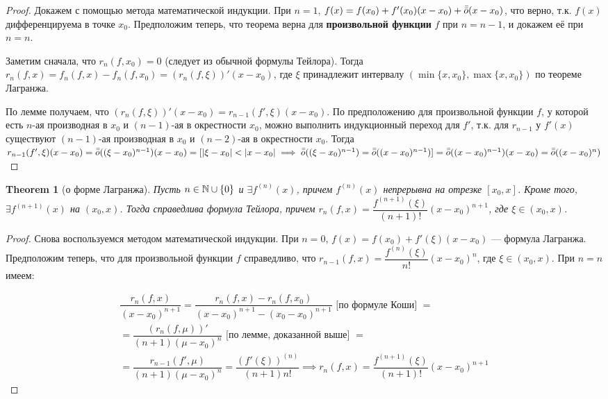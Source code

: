 \documentclass[a4paper]{article}
\theoremstyle{named}
\newtheorem*{namedtheorem}{Theorem}
\begin{document}
\begin{colloq}
		\begin{proof}
			Докажем с помощью метода математической индукции. При $n = 1$, $f(x) = f(x_0) + f'(x_0)(x - x_0) + \bar{\bar{o}}(x - x_0)$, что верно, т.к. $f(x)$ дифференцируема в точке $x_0$. Предположим теперь, что теорема верна для \textbf{произвольной функции} $f$ при $n = n - 1$, и докажем её при $n = n$.

			Заметим сначала, что $r_n(f, x_0) = 0$ (следует из обычной формулы Тейлора). Тогда $r_n(f, x) = f_n(f, x) - f_n(f, x_0) = (r_n(f, \xi))'(x - x_0)$, где $\xi$ принадлежит интервалу $(\min\{x, x_0\}, \max\{x, x_0\})$ по теореме Лагранжа.

			По лемме получаем, что $(r_n(f, \xi))'(x - x_0) = r_{n - 1}(f', \xi)(x - x_0)$. По предположению для произвольной функции $f$, у которой есть $n$-ая производная в $x_0$ и $(n - 1)$-ая в окрестности $x_0$, можно выполнить индукционный переход для $f'$, т.к. для $r_{n - 1}$ у $f'(x)$ существуют $(n - 1)$-ая производная в $x_0$ и $(n - 2)$-ая в окрестности $x_0$. Тогда $r_{n - 1}(f', \xi)(x - x_0) = \bar{\bar{o}}((\xi - x_0)^{n - 1})(x - x_0) = [|\xi - x_0| < |x - x_0| \implies \bar{\bar{o}}((\xi - x_0)^{n - 1}) = \bar{\bar{o}}((x - x_0)^{n - 1})] = \bar{\bar{o}}((x - x_0)^{n - 1})(x - x_0) = \bar{\bar{o}}((x - x_0)^n)$
		\end{proof}

		\begin{namedtheorem}[о форме Лагранжа]
			Пусть $n \in \mathbb{N} \cup \{0\}$ и $\exists f^{(n)}(x)$, причем $f^{(n)}(x)$ непрерывна на отрезке $[x_0, x]$. Кроме того, $\exists f^{(n + 1)}(x)$ на $(x_0, x)$. Тогда справедлива формула Тейлора, причем $r_n(f, x) = \dfrac{f^{(n + 1)}(\xi)}{(n + 1)!}(x - x_0)^{n + 1}$, где $\xi \in (x_0, x)$.
		\end{namedtheorem}

		\begin{proof}
			Снова воспользуемся методом математической индукции. При $n = 0$, $f(x) = f(x_0) + f'(\xi)(x - x_0)$ --- формула Лагранжа. Предположим теперь, что для произвольной функции $f$ справедливо, что $r_{n - 1}(f, x) = \dfrac{f^{(n)}(\xi)}{n!}(x - x_0)^n$, где $\xi \in (x_0, x)$. При $n = n$ имеем:

			\[\begin{gathered}
				\dfrac{r_n(f, x)}{(x - x_0)^{n + 1}} = \dfrac{r_n(f, x) - r_n(f, x_0)}{(x - x_0)^{n + 1} - (x_0 - x_0)^{n + 1}} \text{ [по формуле Коши] } = \\
				= \dfrac{(r_n(f, \mu))'}{(n + 1)(\mu - x_0)^n} \text{ [по лемме, доказанной выше] } = \\
				= \dfrac{r_{n - 1}(f', \mu)}{(n + 1)(\mu - x_0)^n} = \dfrac{(f'(\xi))^{(n)}}{(n + 1)n!} \implies r_n(f, x) = \dfrac{f^{(n + 1)}(\xi)}{(n + 1)!}(x - x_0)^{n + 1}
			\end{gathered}\]
		\end{proof}


\end{colloq}
\end{document}

